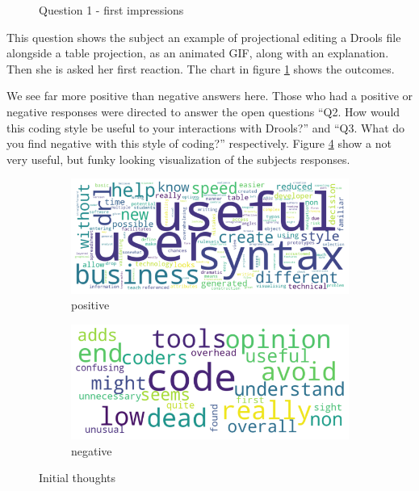 \begin{figure}[H]
    \centering
    \caption{Question 1 - first impressions}
    \label{fig:stackedbar_Q1}
\end{figure}

This question shows the subject an example of projectional editing a Drools file alongside a table projection, as an animated GIF, along with an explanation.
Then she is asked her first reaction. The chart in figure \ref{fig:stackedbar_Q1} shows the outcomes.

We see far more positive than negative answers here.
Those who had a positive or negative responses were directed to answer the open questions ``Q2. How would this coding style be useful to your interactions with Drools?'' and ``Q3. What do you find negative with this style of coding?'' respectively.
Figure \ref{fig:wordclouds} show a not very useful, but funky looking visualization of the subjects responses.

\begin{figure}[H]
    \begin{subfigure}{.60\textwidth}
      \centering
      \includegraphics[width=.95\linewidth]{Sections/images/positive_wordcloud.png}
      \caption{positive}
      \label{fig:wfig1}
    \end{subfigure}%
    \begin{subfigure}{.40\textwidth}
      \centering
      \includegraphics[width=.95\linewidth]{Sections/images/negative_wordcloud.png}
      \caption{negative}
      \label{fig:wfig2}
    \end{subfigure}
    \caption{Initial thoughts}
    \label{fig:wordclouds}
\end{figure}

